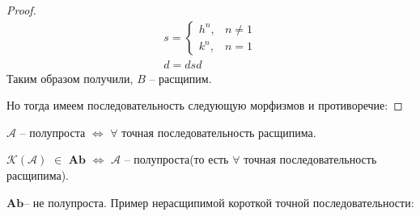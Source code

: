 \begin{to_ex}
\begin{proof}
\eee
\begin{align*}
    s = \begin{cases}h^n, & n\neq 1\\ k^n, & n=1  \end{cases}\\
    d = dsd
\end{align*}
Таким образом получили, $B$ -- расщипим. 

\bee
{}
\eee
Но тогда имеем последовательность следующую морфизмов и противоречие:
\bee
{}
\eee
\end{proof}
\end{to_ex}
\begin{to_def}
$\mathcal{A}$ -- полупроста $\Leftrightarrow$ $\forall$ точная последовательность расщипима.
\end{to_def}
\begin{to_claim}
$\mathcal{K(A)}$ $\in$ $\mathbf{Ab}$ $\Leftrightarrow$ $\mathcal{A}$ -- полупроста(то есть $\forall$ точная последовательность расщипима).
\end{to_claim}
\begin{to_ex}
$\mathbf{Ab}$-- не полупроста. Пример нерасщипимой короткой точной последовательности:
\bee
{}
\eee
\end{to_ex}